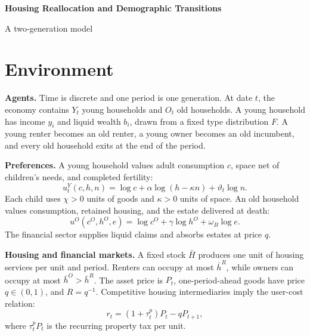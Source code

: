 \documentclass[10pt]{article}
\theoremstyle{definition}
\begin{document}
\begin{center}
{\LARGE\bfseries Housing Reallocation and Demographic Transitions}\par
\vspace{2pt}
{\large A two-generation model}\par
\end{center}

\section{Environment}

\textbf{Agents.} Time is discrete and one period is one generation. At date
$t$, the economy contains $Y_t$ young households and $O_t$ old households. A
young household has income $y_i$ and liquid wealth $b_i$, drawn from a fixed
type distribution $F$. A young renter becomes an old renter, a young owner
becomes an old incumbent, and every old household exits at the end of the
period.

\textbf{Preferences.} A young household values adult consumption $c$, space
net of children's needs, and completed fertility:
\begin{equation}
 u_t^Y(c,h,n)=\log c+\alpha\log(h-\kappa n)+\vartheta_t\log n.
 \label{eq:young_utility}
\end{equation}
Each child uses $\chi>0$ units of goods and $\kappa>0$ units of space. An old
household values consumption, retained housing, and the estate delivered at
death:
\begin{equation}
 u^O(c^O,h^O,e)=\log c^O+\gamma\log h^O+\omega_B\log e.
 \label{eq:old_utility}
\end{equation}
The financial sector supplies liquid claims and absorbs estates at price $q$.

\textbf{Housing and financial markets.} A fixed stock $\bar H$ produces one
unit of housing services per unit and period. Renters can occupy at most
$\bar h^R$, while owners can occupy at most $\bar h^O>\bar h^R$. The asset
price is $P_t$, one-period-ahead goods have price $q\in(0,1)$, and
$R=q^{-1}$. Competitive housing intermediaries imply the user-cost relation:
\begin{equation}
 r_t=(1+\tau_t^p)P_t-qP_{t+1},
 \label{eq:user_cost}
\end{equation}
where $\tau_t^pP_t$ is the recurring property tax per unit.
\end{document}
